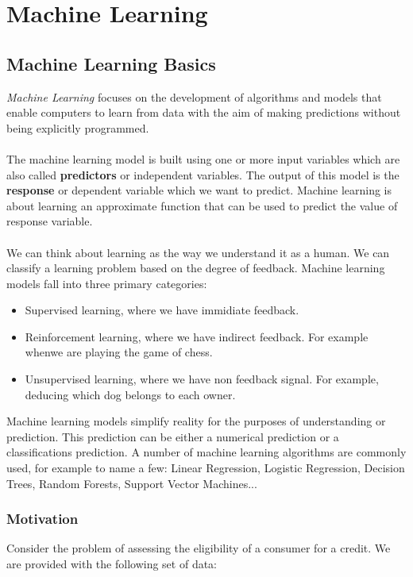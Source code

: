 \documentclass[../main.tex]{subfiles}
\begin{document}
	\chapter{Machine Learning} \label{ch:machine}
	

	\section{Machine Learning Basics}
	\noindent 
	
	\noindent  \textit{Machine Learning} focuses on the development of algorithms and models that enable computers to learn from data with the aim of making predictions without being explicitly programmed. \\ \\ 
	The machine learning model is built using one or more input variables which are also called \textbf{predictors} or independent variables. The output of this model is the \textbf{response} or dependent variable which we want to predict. Machine learning is about learning an approximate function that can be used to predict the value of response variable.\\ \\
	We can think about learning as the way we understand it as a human. We can classify a learning problem based on the degree of feedback. Machine learning models fall into three primary categories:
	\begin{itemize}
		\item Supervised learning, where we have immidiate feedback.
		\item Reinforcement learning, where we have indirect feedback. For example whenwe are playing the game of chess.
		\item Unsupervised learning, where we have non feedback signal. For example, deducing which dog belongs to each owner.
	\end{itemize}
	Machine learning models simplify reality for the purposes of understanding or prediction. This prediction can be either a numerical prediction or a classifications prediction. A number of machine learning algorithms are commonly used, for example to name a few: Linear Regression, Logistic Regression, Decision Trees, Random Forests, Support Vector Machines...
	
	
	\subsection{Motivation }
	\noindent Consider the problem of assessing the eligibility of a consumer for a credit. We are provided with the following set of data: \\ 
	
\end{document}
